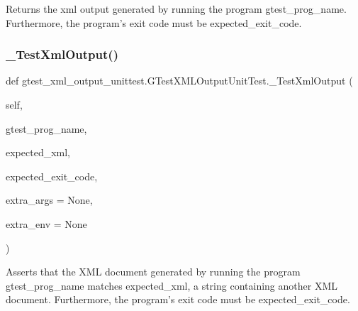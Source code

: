 \begin{DoxyVerb}Returns the xml output generated by running the program gtest_prog_name.
Furthermore, the program's exit code must be expected_exit_code.
\end{DoxyVerb}
 \mbox{\label{classgtest__xml__output__unittest_1_1_g_test_x_m_l_output_unit_test_a1d8a5fdd7e602fe31b1477f8ebc1e7f3}} 
\subsubsection{\texorpdfstring{\_TestXmlOutput()}{\_TestXmlOutput()}}
{\footnotesize\ttfamily def gtest\+\_\+xml\+\_\+output\+\_\+unittest.\+G\+Test\+X\+M\+L\+Output\+Unit\+Test.\+\_\+\+Test\+Xml\+Output (\begin{DoxyParamCaption}\item[{}]{self,  }\item[{}]{gtest\+\_\+prog\+\_\+name,  }\item[{}]{expected\+\_\+xml,  }\item[{}]{expected\+\_\+exit\+\_\+code,  }\item[{}]{extra\+\_\+args = {\ttfamily None},  }\item[{}]{extra\+\_\+env = {\ttfamily None} }\end{DoxyParamCaption})\hspace{0.3cm}{\ttfamily [private]}}

\begin{DoxyVerb}Asserts that the XML document generated by running the program
gtest_prog_name matches expected_xml, a string containing another
XML document.  Furthermore, the program's exit code must be
expected_exit_code.
\end{DoxyVerb}
 \mbox{\label{classgtest__xml__output__unittest_1_1_g_test_x_m_l_output_unit_test_a01ca66e14468028e5c4eb809987113cf}} 

